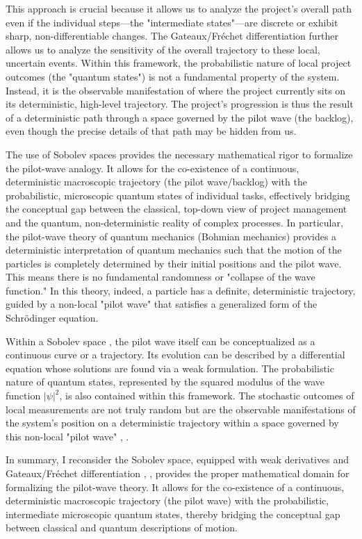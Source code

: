 \documentclass{article}
\begin{document}
This approach is crucial because it allows us to analyze the project's overall path even if the individual steps—the "intermediate states"—are discrete or exhibit sharp, non-differentiable changes. The Gateaux/Fréchet differentiation further allows us to analyze the sensitivity of the overall trajectory to these local, uncertain events. Within this framework, the probabilistic nature of local project outcomes (the "quantum states") is not a fundamental property of the system. Instead, it is the observable manifestation of where the project currently sits on its deterministic, high-level trajectory. The project's progression is thus the result of a deterministic path through a space governed by the pilot wave (the backlog), even though the precise details of that path may be hidden from us.

The use of Sobolev spaces provides the necessary mathematical rigor to formalize the pilot-wave analogy. It allows for the co-existence of a continuous, deterministic macroscopic trajectory (the pilot wave/backlog) with the probabilistic, microscopic quantum states of individual tasks, effectively bridging the conceptual gap between the classical, top-down view of project management and the quantum, non-deterministic reality of complex processes. In particular, the pilot-wave theory of quantum mechanics (Bohmian mechanics) \cite{bohm1952suggested1} provides a deterministic interpretation of quantum mechanics such that the motion of the particles is completely determined by their initial positions and the pilot wave. This means there is no fundamental randomness or "collapse of the wave function." In this theory, indeed, a particle has a definite, deterministic trajectory, guided by a non-local "pilot wave" that satisfies a generalized form of the Schrödinger equation.

Within a Sobolev space \cite{sobolev1938}, the pilot wave itself can be conceptualized as a continuous curve or a trajectory. Its evolution can be described by a differential equation whose solutions are found via a weak formulation. The probabilistic nature of quantum states, represented by the squared modulus of the wave function $|\psi|^2$, is also contained within this framework. The stochastic outcomes of local measurements are not truly random but are the observable manifestations of the system's position on a deterministic trajectory within a space governed by this non-local "pilot wave" \cite{bohm1952suggested1}, \cite{debroglie1927nouvelle}.

In summary, I reconsider the Sobolev space, equipped with weak derivatives and Gateaux/Fréchet differentiation \cite{frechet1909calcul}, \cite{gateaux1919fonctions}, provides the proper mathematical domain for formalizing the pilot-wave theory. It allows for the co-existence of a continuous, deterministic macroscopic trajectory (the pilot wave) with the probabilistic, intermediate microscopic quantum states, thereby bridging the conceptual gap between classical and quantum descriptions of motion.
\newpage
\end{document}
